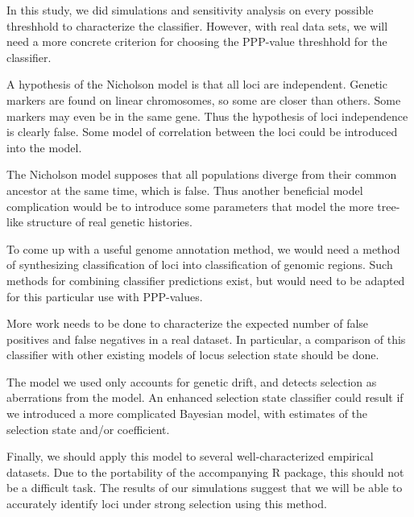 \documentclass[a4paper,12pt]{article}
\begin{document}
In this study, we did simulations and sensitivity analysis on every
possible threshhold to characterize the classifier. However, with real
data sets, we will need a more concrete criterion for choosing the
PPP-value threshhold for the classifier.

A hypothesis of the Nicholson model is that all loci are
independent. Genetic markers are found on linear chromosomes, so some
are closer than others. Some markers may even be in the same
gene. Thus the hypothesis of loci independence is clearly false. Some
model of correlation between the loci could be introduced into the
model.

The Nicholson model supposes that all populations diverge from their
common ancestor at the same time, which is false. Thus another
beneficial model complication would be to introduce some parameters
that model the more tree-like structure of real genetic histories.

To come up with a useful genome annotation method, we would need a
method of synthesizing classification of loci into classification of
genomic regions. Such methods for combining classifier predictions
exist, but would need to be adapted for this particular use with
PPP-values.

More work needs to be done to characterize the expected number of
false positives and false negatives in a real dataset. In particular,
a comparison of this classifier with other existing models of locus
selection state should be done.

The model we used only accounts for genetic drift, and detects
selection as aberrations from the model. An enhanced selection state
classifier could result if we introduced a more complicated Bayesian
model, with estimates of the selection state and/or coefficient.

Finally, we should apply this model to several well-characterized
empirical datasets. Due to the portability of the accompanying R
package, this should not be a difficult task. The results of our
simulations suggest that we will be able to accurately identify loci
under strong selection using this method.



\end{document}
